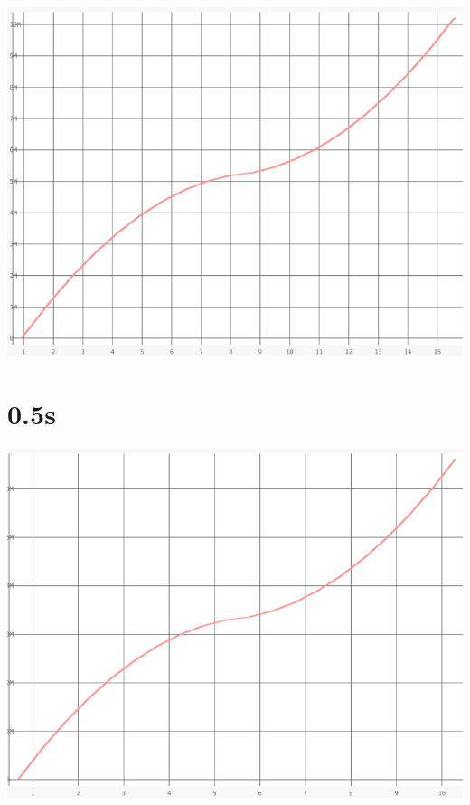 \documentclass{article}
\begin{document}
    \begin{center}
    \includegraphics[angle=90]{set_a_0.75s/set_a_0_75s.png}
    \end{center}
\clearpage

\section{0.5s}
    \noindent\begin{minipage}{.45\textwidth}
    
    \end{minipage}\hfill
    \begin{minipage}{.45\textwidth}
    
    \end{minipage}
    
    \begin{center}
    \includegraphics[angle=90]{set_a_0.5s/set_a_0_5s.png}
    \end{center}
\clearpage
\end{document}
